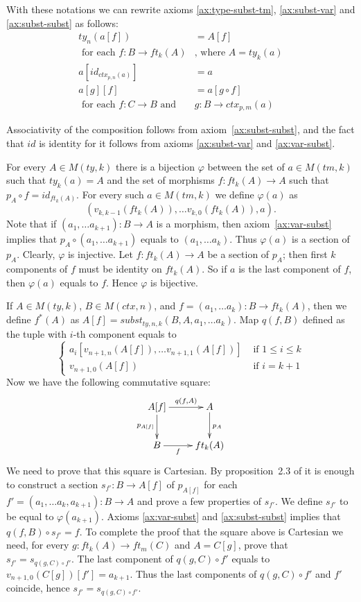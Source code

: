 \documentclass[reqno]{amsart}
\theoremstyle{definition}
\theoremstyle{remark}
\numberwithin{figure}{section}
\begin{document}
With these notations we can rewrite axioms \eqref{ax:type-subst-tm}, \eqref{ax:subst-var} and \eqref{ax:subst-subst} as follows:
\begin{align*}
ty_n(a[f]) & = A[f] \\
\text{ for each } f : B \to ft_k(A) & \text{, where } A = ty_k(a) \\
a[id_{ctx_{p,n}(a)}] & = a \\
a[g][f] & = a[g \circ f] \\
\text{ for each } f : C \to B \text{ and } & g : B \to ctx_{p,m}(a)
\end{align*}

Associativity of the composition follows from axiom~\eqref{ax:subst-subst}, and the fact that $id$ is identity for it follows from axioms \eqref{ax:subst-var} and \eqref{ax:var-subst}.

For every $A \in M(ty,k)$ there is a bijection $\varphi$ between the set of $a \in M(tm,k)$ such that $ty_k(a) = A$
    and the set of morphisms $f : ft_k(A) \to A$ such that $p_A \circ f = id_{ft_k(A)}$.
For every such $a \in M(tm,k)$ we define $\varphi(a)$ as
\[ (v_{k,k-1}(ft_k(A)), \ldots v_{k,0}(ft_k(A)), a). \]
Note that if $(a_1, \ldots a_{k+1}) : B \to A$ is a morphism, then axiom~\eqref{ax:var-subst} implies that $p_A \circ (a_1, \ldots a_{k+1})$ equals to $(a_1, \ldots a_k)$.
Thus $\varphi(a)$ is a section of $p_A$.
Clearly, $\varphi$ is injective.
Let $f : ft_k(A) \to A$ be a section of $p_A$; then first $k$ components of $f$ must be identity on $ft_k(A)$.
So if $a$ is the last component of $f$, then $\varphi(a)$ equals to $f$.
Hence $\varphi$ is bijective.

If $A \in M(ty,k)$, $B \in M(ctx,n)$, and $f = (a_1, \ldots a_k) : B \to ft_k(A)$, then we define $f^*(A)$ as $A[f] = subst_{ty,n,k}(B, A, a_1, \ldots a_k)$.
Map $q(f,B)$ defined as the tuple with $i$-th component equals to
\[ \left\{
  \begin{array}{lr}
    a_i[v_{n+1,n}(A[f]), \ldots v_{n+1,1}(A[f])] & \text{ if } 1 \leq i \leq k \\
    v_{n+1,0}(A[f])                              & \text{ if } i = k+1
  \end{array}
\right. \]
Now we have the following commutative square:
\[ \xymatrix{ A[f] \ar[r]^-{q(f,A)} \ar[d]_{p_{A[f]}} & A \ar[d]^{p_A} \\
              B \ar[r]_-f                             & ft_k(A)
            } \]
We need to prove that this square is Cartesian.
By proposition~2.3 of \cite{c-systems} it is enough to construct a section $s_{f'} : B \to A[f]$ of $p_{A[f]}$
    for each $f' = (a_1, \ldots a_k, a_{k+1}) : B \to A$ and prove a few properties of $s_{f'}$.
We define $s_{f'}$ to be equal to $\varphi(a_{k+1})$.
Axioms \eqref{ax:var-subst} and \eqref{ax:subst-subst} implies that $q(f,B) \circ s_{f'} = f$.
To complete the proof that the square above is Cartesian we need, for every $g : ft_k(A) \to ft_m(C)$ and $A = C[g]$, prove that $s_{f'} = s_{q(g,C) \circ f'}$.
The last component of $q(g,C) \circ f'$ equals to $v_{n+1,0}(C[g])[f'] = a_{k+1}$.
Thus the last components of $q(g,C) \circ f'$ and $f'$ coincide, hence $s_{f'} = s_{q(g,C) \circ f'}$.
\end{document}
